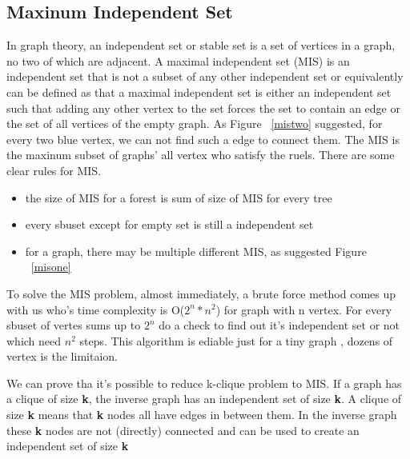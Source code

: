 \documentclass[10pt, a4paper, twocolumn]{article} %
\begin{document}
\subsection{Maxinum Independent Set}
In graph theory, an independent set or stable set is a set of vertices in a
graph, no two of which are adjacent.
A maximal independent set (MIS) is an independent set
that is not a subset of any other independent set or equivalently can be defined
as that a maximal independent set is either an independent set such that adding
any other vertex to the set forces the set to contain an edge or the set of all vertices of the empty graph.
As Figure ~\ref{mistwo} suggested, for every two blue vertex, we can not find
such a edge to connect them. The MIS is the maxinum subset of graphs' all vertex who
satisfy the ruels. There are some clear rules for MIS.
\begin{itemize}
	\item the size of MIS for a forest is sum of size of MIS for every tree
    \item every sbuset except for empty set is still a independent set
	\item for a graph, there may be multiple different MIS, as suggested
        Figure ~\ref{misone}
\end{itemize}
To solve the MIS problem, almost immediately, a brute force method comes up with
us who's time complexity is O(\(2^n * n^2\)) for graph with n vertex. For every
sbuset of vertes sums up to \(2^n\) do a check to find out it's independent set
or not which need \(n^2\) steps. This algorithm is ediable just for a tiny graph
, dozens of vertex is the limitaion.

We can prove tha it's possible to reduce k-clique problem to MIS. If a graph
has a clique of size \textbf{k}, the inverse graph has an independent set of
size \textbf{k}. A clique of size \textbf{k} means that \textbf{k} nodes all
have edges in between them. In the inverse graph these \textbf{k} nodes are
not (directly) connected and can be used to create an independent set of size
\textbf{k}
\end{document}
